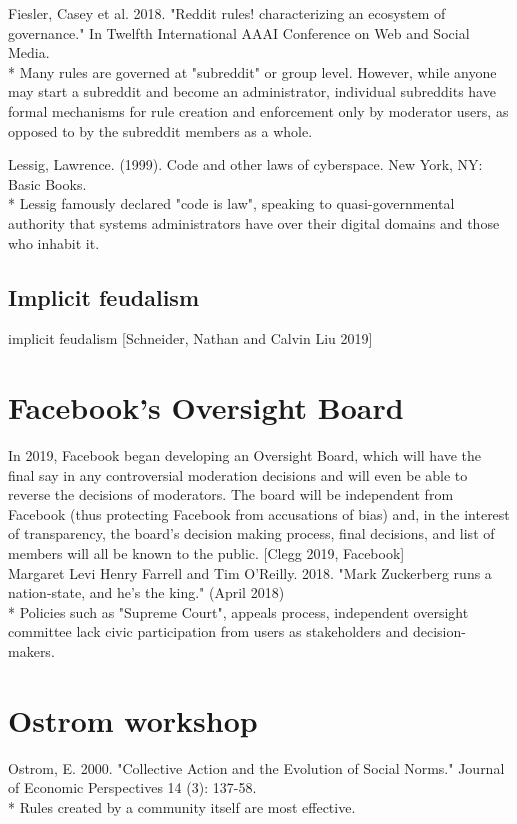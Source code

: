 \documentclass[class=book, crop=false]{standalone}
\begin{document}
Fiesler, Casey et al. 2018. "Reddit rules! characterizing an ecosystem of governance." In Twelfth International AAAI Conference on Web and Social Media.\\
 * Many rules are governed at "subreddit" or group level. However, while anyone may start a subreddit and become an administrator, individual subreddits have formal mechanisms for rule creation and enforcement only by moderator users, as opposed to by the subreddit members as a whole.

Lessig, Lawrence. (1999). Code and other laws of cyberspace. New York, NY: Basic Books.\\
 * Lessig famously declared "code is law", speaking to quasi-governmental authority that systems administrators have over their digital domains and those who inhabit it.

\subsection{Implicit feudalism}

implicit feudalism [Schneider, Nathan and Calvin Liu 2019]

\section{Facebook's Oversight Board}

In 2019, Facebook began developing an Oversight Board, which will have the final say in any controversial moderation decisions and will even be able to reverse the decisions of moderators. The board will be independent from Facebook (thus protecting Facebook from accusations of bias) and, in the interest of transparency, the board's decision making process, final decisions, and list of members will all be known to the public. [Clegg 2019, Facebook]\\

Margaret Levi Henry Farrell and Tim O'Reilly. 2018. "Mark Zuckerberg runs a nation-state, and he's the king." (April 2018)\\
 * Policies such as "Supreme Court", appeals process, independent oversight committee lack civic participation from users as stakeholders and decision-makers.

\section{Ostrom workshop}

Ostrom, E. 2000. "Collective Action and the Evolution of Social Norms." Journal of Economic Perspectives 14 (3): 137-58.\\
 * Rules created by a community itself are most effective.
\end{document}
